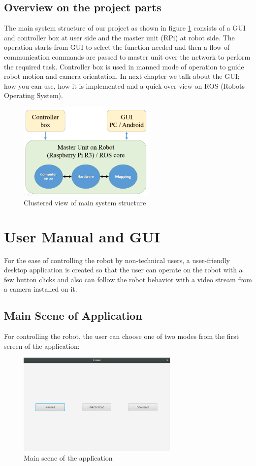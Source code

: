 \documentclass[12pt]{article}
\newcommand\blankpage{%
	\null
	\thispagestyle{empty}%
	\addtocounter{page}{-1}%
	\newpage}
\begin{document}
\subsection{Overview on the project parts}
The main system structure of our project as shown in figure \ref{fig:system-structure} consists of a GUI and controller box at user side and the master unit (RPi) at robot side. The operation starts from GUI to select the function needed and then a flow of communication commands are passed to master unit over the network to perform the required task. Controller box is used in manned mode of operation to guide robot motion and camera orientation. In next chapter we talk about the GUI; how you can use, how it is implemented and a quick over view on ROS (Robots Operating System).
\begin{figure}[H]
	\centering
	\includegraphics[width =0.6\textwidth]{Fig/overview.png}
	\caption{Clustered view of main system structure}
	\label{fig:system-structure}
\end{figure}

\afterpage{\blankpage}
\newpage

\section{User Manual and GUI}
For the ease of controlling the robot by non-technical users, a user-friendly desktop application is created so that the user can operate on the robot with a few button clicks and also can follow the robot behavior with a video stream from a camera installed on it.

\subsection{Main Scene of Application}
For controlling the robot, the user can choose one of two modes from the first screen of the application:
\begin{figure}[H]
	\centering
	\includegraphics[width =0.7\textwidth]{Fig/gui-main.png}
	\caption{ Main scene of the application}
	\label{fig:gui-main}
\end{figure}
\end{document}
